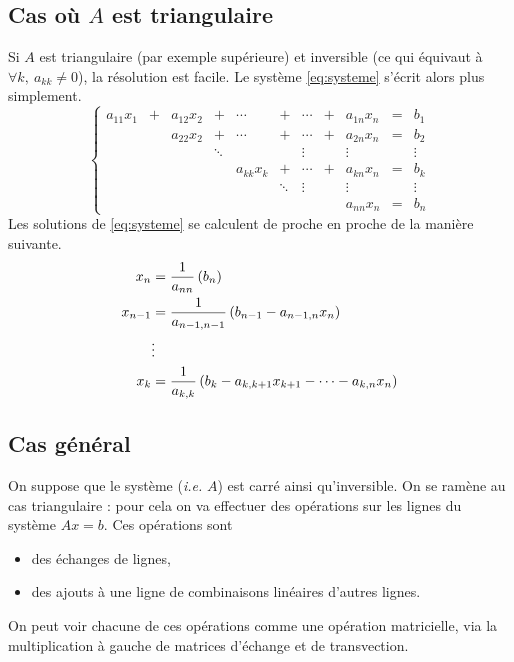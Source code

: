 \subsection{Cas où $A$ est triangulaire}

Si $A$ est triangulaire (par exemple supérieure) et inversible (ce qui équivaut à $\forall
k,~a_{kk}\neq 0$), la résolution est facile. Le système \eqref{eq:systeme} s'écrit alors plus simplement. 
\begin{equation*}
\left\{\begin{array}{ccccccccccc}
  a_{11}x_{1} &+& a_{12}x_{2} &+& \cdots &+& \cdots&+& a_{1n}x_{n} &=& b_{1}\\
  && a_{22} x_{2}&+ & \cdots &+& \cdots&+&a_{2n}x_{n}& = &b_{2}\\
  & &&\ddots & & & \vdots && \vdots & &\vdots\\
  &&&& a_{kk}x_{k}&+&\cdots&+&a_{kn}x_{n}&=&b_{k}\\
  &&&&      &\ddots &\vdots&&\vdots& & \vdots\\
  &&&&      &       &      &&a_{nn}x_{n}&=&b_{n}
\end{array} \right. 
\end{equation*}
Les solutions de \eqref{eq:systeme} se calculent de proche en proche de la manière suivante. 
\begin{align*}
  x_{n} &= \frac{1}{a_{nn}}\left( b_{n}\right)\\
  x_{n-1} &= \frac{1}{a_{n-1,n-1}}\left( b_{n-1}-a_{n-1, n}x_{n}\right)\\
 & \vdots\\
  x_{k} &= \frac{1}{a_{k,k}}\left( b_{k}-a_{k,k+1}x_{k+1}-\cdots -a_{k,n}x_{n}\right)\\
\end{align*}


\subsection{Cas général}

On suppose que le système (\emph{i.e.} $A$) est carré ainsi qu'inversible.
On se ramène au cas triangulaire : pour cela on va effectuer des
opérations sur les lignes du système $Ax = b$. Ces opérations sont 
\begin{itemize}
  \item des échanges de lignes,
  \item des ajouts à une ligne de combinaisons linéaires d'autres lignes.
\end{itemize}
On peut voir chacune de ces opérations comme une opération matricielle, via la multiplication à gauche de matrices 
d'échange et de transvection.

